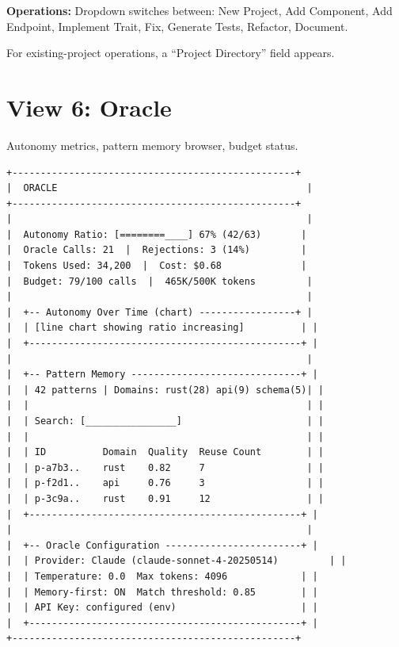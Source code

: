 \documentclass[11pt,a4paper,twoside]{article}
\begin{document}
\textbf{Operations:} Dropdown switches between: New Project,
Add Component, Add Endpoint, Implement Trait, Fix, Generate Tests,
Refactor, Document.

For existing-project operations, a ``Project Directory'' field
appears.


\section{View 6: Oracle}\label{sec:oracle}

Autonomy metrics, pattern memory browser, budget status.

\begin{lstlisting}[title={Oracle Layout}]
+--------------------------------------------------+
|  ORACLE                                            |
+--------------------------------------------------+
|                                                    |
|  Autonomy Ratio: [========____] 67% (42/63)       |
|  Oracle Calls: 21  |  Rejections: 3 (14%)         |
|  Tokens Used: 34,200  |  Cost: $0.68              |
|  Budget: 79/100 calls  |  465K/500K tokens         |
|                                                    |
|  +-- Autonomy Over Time (chart) -----------------+ |
|  | [line chart showing ratio increasing]          | |
|  +------------------------------------------------+ |
|                                                    |
|  +-- Pattern Memory ------------------------------+ |
|  | 42 patterns | Domains: rust(28) api(9) schema(5)| |
|  |                                                 | |
|  | Search: [________________]                      | |
|  |                                                 | |
|  | ID          Domain  Quality  Reuse Count        | |
|  | p-a7b3..    rust    0.82     7                  | |
|  | p-f2d1..    api     0.76     3                  | |
|  | p-3c9a..    rust    0.91     12                 | |
|  +------------------------------------------------+ |
|                                                    |
|  +-- Oracle Configuration ------------------------+ |
|  | Provider: Claude (claude-sonnet-4-20250514)         | |
|  | Temperature: 0.0  Max tokens: 4096             | |
|  | Memory-first: ON  Match threshold: 0.85        | |
|  | API Key: configured (env)                      | |
|  +------------------------------------------------+ |
+--------------------------------------------------+
\end{lstlisting}
\end{document}
